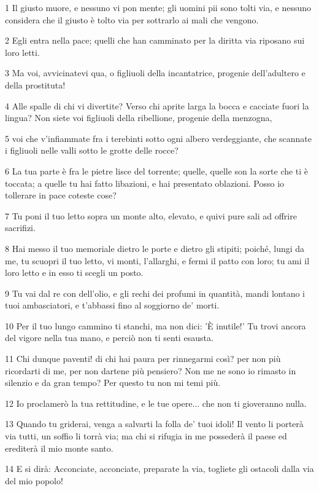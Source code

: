 \par 1 Il giusto muore, e nessuno vi pon mente; gli uomini pii sono tolti via, e nessuno considera che il giusto è tolto via per sottrarlo ai mali che vengono.
\par 2 Egli entra nella pace; quelli che han camminato per la diritta via riposano sui loro letti.
\par 3 Ma voi, avvicinatevi qua, o figliuoli della incantatrice, progenie dell'adultero e della prostituta!
\par 4 Alle spalle di chi vi divertite? Verso chi aprite larga la bocca e cacciate fuori la lingua? Non siete voi figliuoli della ribellione, progenie della menzogna,
\par 5 voi che v'infiammate fra i terebinti sotto ogni albero verdeggiante, che scannate i figliuoli nelle valli sotto le grotte delle rocce?
\par 6 La tua parte è fra le pietre lisce del torrente; quelle, quelle son la sorte che ti è toccata; a quelle tu hai fatto libazioni, e hai presentato oblazioni. Posso io tollerare in pace coteste cose?
\par 7 Tu poni il tuo letto sopra un monte alto, elevato, e quivi pure sali ad offrire sacrifizi.
\par 8 Hai messo il tuo memoriale dietro le porte e dietro gli stipiti; poiché, lungi da me, tu scuopri il tuo letto, vi monti, l'allarghi, e fermi il patto con loro; tu ami il loro letto e in esso ti scegli un posto.
\par 9 Tu vai dal re con dell'olio, e gli rechi dei profumi in quantità, mandi lontano i tuoi ambasciatori, e t'abbassi fino al soggiorno de' morti.
\par 10 Per il tuo lungo cammino ti stanchi, ma non dici: 'È inutile!' Tu trovi ancora del vigore nella tua mano, e perciò non ti senti esausta.
\par 11 Chi dunque paventi! di chi hai paura per rinnegarmi così? per non più ricordarti di me, per non dartene più pensiero? Non me ne sono io rimasto in silenzio e da gran tempo? Per questo tu non mi temi più.
\par 12 Io proclamerò la tua rettitudine, e le tue opere... che non ti gioveranno nulla.
\par 13 Quando tu griderai, venga a salvarti la folla de' tuoi idoli! Il vento li porterà via tutti, un soffio li torrà via; ma chi si rifugia in me possederà il paese ed erediterà il mio monte santo.
\par 14 E si dirà: Acconciate, acconciate, preparate la via, togliete gli ostacoli dalla via del mio popolo!

